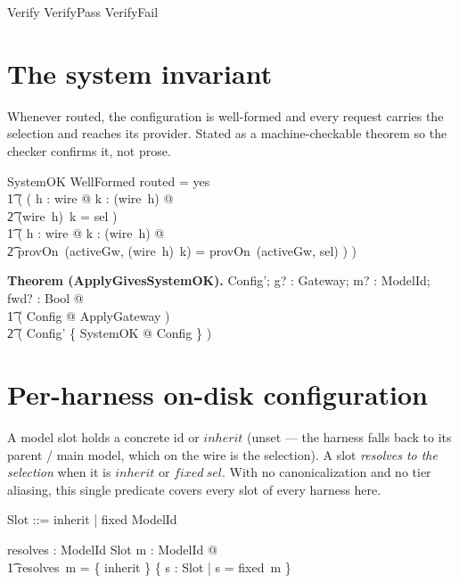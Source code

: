 \documentclass{article}
\makeatletter
\newenvironment{theorem}[1]{\medskip\noindent\textbf{Theorem (#1).}\@nameuse{zed}}{\@nameuse{endzed}}
\makeatother
\begin{document}
\begin{zed}
  Verify  VerifyPass \lor VerifyFail
\end{zed}

\section{The system invariant}

Whenever routed, the configuration is well-formed and every request carries the
selection and reaches its provider. Stated as a machine-checkable theorem so the
checker confirms it, not prose.

\begin{schema}{SystemOK}
  WellFormed
\where
  routed = yes \implies \\
  \t1 ( ( \forall h : \dom wire @ \forall k : \dom (wire~h) @ \\
  \t2     (wire~h)~k = sel ) \land \\
  \t1   ( \forall h : \dom wire @ \forall k : \dom (wire~h) @ \\
  \t2     provOn~(activeGw, (wire~h)~k) = provOn~(activeGw, sel) ) )
\end{schema}

\begin{theorem}{ApplyGivesSystemOK}
  \forall Config'; g? : Gateway; m? : ModelId; fwd? : Bool @ \\
  \t1 ( \exists Config @ ApplyGateway ) \implies \\
  \t2 ( \theta Config' \in \{ SystemOK @ \theta Config \} )
\end{theorem}

\section{Per-harness on-disk configuration}

A model slot holds a concrete id or $inherit$ (unset --- the harness falls back
to its parent / main model, which on the wire is the selection). A slot
\emph{resolves to the selection} when it is $inherit$ or $fixed~sel$. With no
canonicalization and no tier aliasing, this single predicate covers every slot
of every harness here.

\begin{zed}
  Slot ::= inherit | fixed \ldata ModelId \rdata
\end{zed}

\begin{axdef}
  resolves : ModelId \fun \power Slot
\where
  \forall m : ModelId @ \\
  \t1 resolves~m = \{ inherit \} \cup \{ s : Slot | s = fixed~m \}
\end{axdef}
\end{document}
